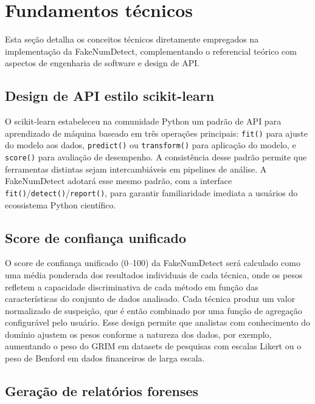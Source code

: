 \documentclass[
    12pt,                %
    openright,           %
    oneside,             %
    a4paper,             %
    english,             %
    brazil               %
]{abntex2}
\begin{document}
\section{Fundamentos técnicos}
\label{sec:fundamentos}

Esta seção detalha os conceitos técnicos diretamente empregados na implementação da FakeNumDetect, 
complementando o referencial teórico com aspectos de engenharia de software e design de API.

\subsection{Design de API estilo scikit-learn}

O scikit-learn \cite{Pedregosa2011} estabeleceu na comunidade Python um padrão de API para aprendizado de 
máquina baseado em três operações principais: \texttt{fit()} para ajuste do modelo aos dados, \texttt{predict()} ou \texttt{transform()} para 
aplicação do modelo, e \texttt{score()} para avaliação de desempenho. A consistência desse padrão permite que ferramentas distintas sejam 
intercambiáveis em pipelines de análise. A FakeNumDetect adotará esse mesmo padrão, com a 
interface \texttt{fit()}/\texttt{detect()}/\texttt{report()}, para garantir familiaridade imediata a usuários do ecossistema Python científico.

\subsection{Score de confiança unificado}

O score de confiança unificado (0--100) da FakeNumDetect será calculado como uma média ponderada dos 
resultados individuais de cada técnica, onde os pesos refletem a capacidade discriminativa de cada método em 
função das características do conjunto de dados analisado. Cada técnica produz um valor normalizado de suspeição, 
que é então combinado por uma função de agregação configurável pelo usuário. Esse design permite que analistas com 
conhecimento do domínio ajustem os pesos conforme a natureza dos dados, por exemplo, aumentando o peso do GRIM em 
datasets de pesquisas com escalas Likert ou o peso de Benford em dados financeiros de larga escala.

\subsection{Geração de relatórios forenses}
\end{document}
